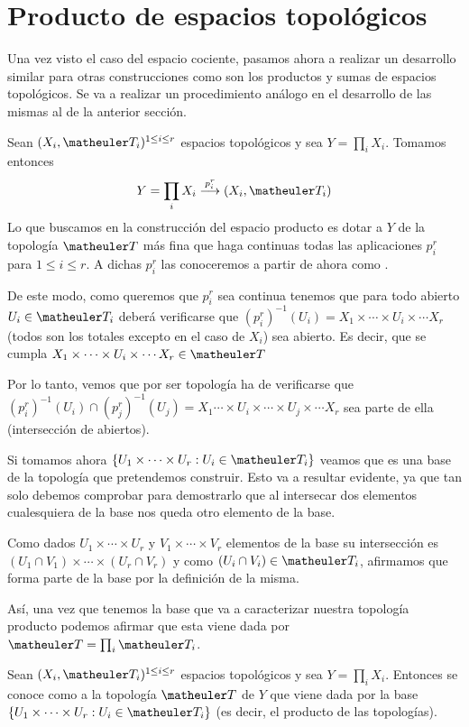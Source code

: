 \section{Producto de espacios topológicos}
Una vez visto el caso del espacio cociente, pasamos ahora a realizar un desarrollo similar para otras construcciones como son los productos y sumas de espacios topológicos. Se va a realizar un procedimiento análogo en el desarrollo de las mismas al de la anterior sección.

Sean $(X_{i },\T_{i})^{1\le i\le r}$ espacios topológicos y sea $Y=\prod_i X_i$. Tomamos entonces 
\begin{equation}
Y=\prod_i X_i \stackrel{p_i^r}{\longrightarrow}(X_i,\T_i)
\end{equation}
Lo que buscamos en la construcción del espacio producto es dotar a $Y$ de la topología $\T$ más fina que haga continuas todas las aplicaciones $p_i^r$ para $1\le i\le r$. A dichas  $p_i^r$ las conoceremos a partir de ahora como .

De este modo, como queremos que $p_i^r$ sea continua  tenemos que para todo abierto $U_i\in \T_i$ deberá verificarse que $(p_i^r)^{-1}(U_i)=X_1\times\cdots\times U_i\times\cdots X_r$ (todos son los totales excepto en el caso de $X_i$) sea abierto. Es decir, que se cumpla $X_1\times\cdots\times U_i \times\cdots X_r\in \T$

Por lo tanto, vemos que por ser topología ha de verificarse que $(p_i^r)^{-1}(U_i)\cap (p_j^r)^{-1}(U_j)= X_1\cdots\times U_i \times\cdots\times U_j\times \cdots X_r$ sea parte de ella (intersección de abiertos).

Si tomamos ahora $ \{ U_1\times\cdots\times U_r : U_i\in \T_i \}$ veamos que es una base de la topología que pretendemos construir. Esto va a resultar evidente, ya que tan solo debemos comprobar para demostrarlo que al intersecar dos elementos cualesquiera de la base nos queda otro elemento de la base. 

Como dados $U_1\times\cdots\times U_r$ y $V_1\times\cdots\times V_r$ elementos de la base su intersección es $(U_1\cap V_1)\times\cdots\times (U_r\cap V_r)$ y como $(U_i\cap V_i)\in \T_i$, afirmamos que forma parte de la base por la definición de la misma.

Así, una vez que tenemos la base que va a caracterizar nuestra topología producto podemos afirmar que esta viene dada por $\T=\prod_i \T_i$.

\begin{defi}
	Sean $(X_{i },\T_{i})^{1\le i\le r}$ espacios topológicos y sea $Y=\prod_i X_i$. Entonces se conoce como  a la topología $\T$ de $Y$ que viene dada por la base $ \{ U_1\times\cdots\times U_r : U_i\in \T_i \}$ (es decir, el producto de las topologías).
\end{defi}

